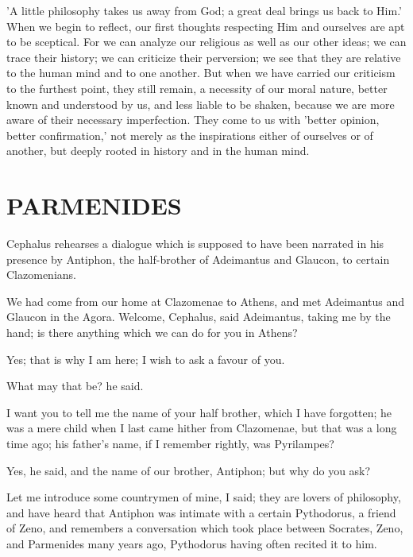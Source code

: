 \documentclass[11pt,letter]{article}
\begin{document}
\par  'A little philosophy takes us away from God; a great deal brings us back to Him.' When we begin to reflect, our first thoughts respecting Him and ourselves are apt to be sceptical. For we can analyze our religious as well as our other ideas; we can trace their history; we can criticize their perversion; we see that they are relative to the human mind and to one another. But when we have carried our criticism to the furthest point, they still remain, a necessity of our moral nature, better known and understood by us, and less liable to be shaken, because we are more aware of their necessary imperfection. They come to us with 'better opinion, better confirmation,' not merely as the inspirations either of ourselves or of another, but deeply rooted in history and in the human mind.

\par 
\section{
      PARMENIDES
    } 
\par  Cephalus rehearses a dialogue which is supposed to have been narrated in his presence by Antiphon, the half-brother of Adeimantus and Glaucon, to certain Clazomenians.

\par  We had come from our home at Clazomenae to Athens, and met Adeimantus and Glaucon in the Agora. Welcome, Cephalus, said Adeimantus, taking me by the hand; is there anything which we can do for you in Athens?

\par  Yes; that is why I am here; I wish to ask a favour of you.

\par  What may that be? he said.

\par  I want you to tell me the name of your half brother, which I have forgotten; he was a mere child when I last came hither from Clazomenae, but that was a long time ago; his father's name, if I remember rightly, was Pyrilampes?

\par  Yes, he said, and the name of our brother, Antiphon; but why do you ask?

\par  Let me introduce some countrymen of mine, I said; they are lovers of philosophy, and have heard that Antiphon was intimate with a certain Pythodorus, a friend of Zeno, and remembers a conversation which took place between Socrates, Zeno, and Parmenides many years ago, Pythodorus having often recited it to him.
\end{document}
